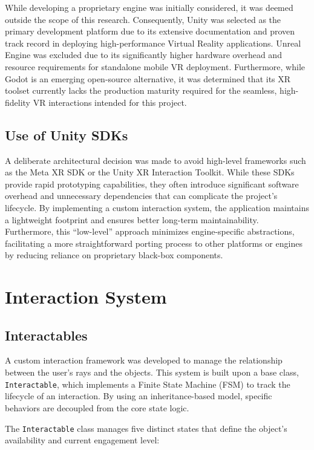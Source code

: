 \documentclass[inscr,ack,preface]{dithesis}
\begin{document}
While developing a proprietary engine was initially considered, it was deemed outside the scope of this research.
Consequently, Unity was selected as the primary development platform due to its extensive documentation and proven track record
in deploying high-performance Virtual Reality applications. Unreal Engine was excluded due to its significantly higher hardware overhead
and resource requirements for standalone mobile VR deployment. Furthermore, while Godot is an emerging open-source alternative,
it was determined that its XR toolset currently lacks the production maturity required for the seamless,
high-fidelity VR interactions intended for this project.

\subsection{Use of Unity SDKs}

A deliberate architectural decision was made to avoid high-level frameworks such as the Meta XR SDK or the Unity XR Interaction Toolkit.
While these SDKs provide rapid prototyping capabilities, they often introduce significant software overhead and unnecessary dependencies
that can complicate the project's lifecycle. By implementing a custom interaction system, the application maintains a lightweight footprint
and ensures better long-term maintainability. Furthermore, this ``low-level'' approach minimizes engine-specific abstractions, facilitating
a more straightforward porting process to other platforms or engines by reducing reliance on proprietary black-box components.

\section{Interaction System}

\subsection{Interactables}

A custom interaction framework was developed to manage the relationship between the user's rays and the objects.
This system is built upon a base class, \texttt{Interactable}, which implements a Finite State Machine (FSM)
to track the lifecycle of an interaction. By using an inheritance-based model, specific behaviors are decoupled from the core state logic.

The \texttt{Interactable} class manages five distinct states that define the object's availability and current engagement level:
\end{document}
